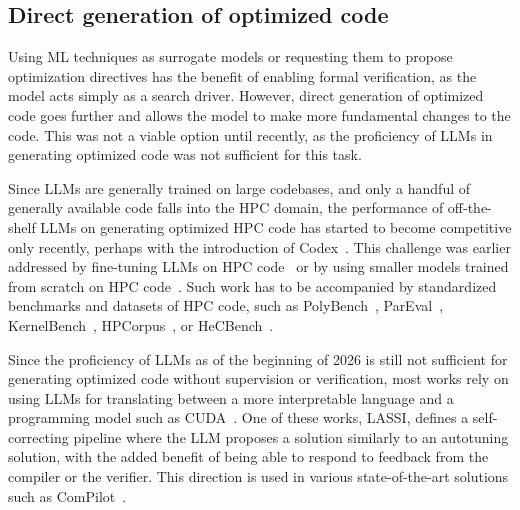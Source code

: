 
\subsection{Direct generation of optimized code}\label{sec:ml-direct-code-generation}

Using ML techniques as surrogate models or requesting them to propose optimization directives has the benefit of enabling formal verification, as the model acts simply as a search driver. However, direct generation of optimized code goes further and allows the model to make more fundamental changes to the code. This was not a viable option until recently, as the proficiency of LLMs in generating optimized code was not sufficient for this task.


Since LLMs are generally trained on large codebases, and only a handful of generally available code falls into the HPC domain, the performance of off-the-shelf LLMs on generating optimized HPC code has started to become competitive only recently, perhaps with the introduction of Codex~\cite{chen2021evaluating}. This challenge was earlier addressed by fine-tuning LLMs on HPC code~\cite{nichols2024performance} or by using smaller models trained from scratch on HPC code~\cite{xu2022systematic}. Such work has to be accompanied by standardized benchmarks and datasets of HPC code, such as PolyBench~\cite{pouchet2012polybench}, ParEval~\cite{nichols2024can}, KernelBench~\cite{ouyang2025kernelbench}, HPCorpus~\cite{kadosh2023quantifying}, or HeCBench~\cite{jin2023benchmark}.

Since the proficiency of LLMs as of the beginning of 2026 is still not sufficient for generating optimized code without supervision or verification, most works rely on using LLMs for translating between a more interpretable language and a programming model such as CUDA~\cite{palkowski2024gpt,dearing2024lassi}. One of these works, LASSI, defines a self-correcting pipeline where the LLM proposes a solution similarly to an autotuning solution, with the added benefit of being able to respond to feedback from the compiler or the verifier. This direction is used in various state-of-the-art solutions such as ComPilot~\cite{merouani2025agentic}.
